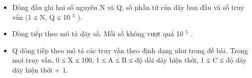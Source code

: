 \begin{itemize}
	\item     Dòng đầu ghi hai số nguyên N và Q, số phần tử của dãy ban đầu và số truy vấn (1 ≤ N, Q ≤ 10    $^     5    $    ).   
	\item     Dòng tiếp theo mô tả dãy số. Mỗi số không vượt quá 10    $^     5    $    .   
	\item     Q dòng tiếp theo mô tả các truy vấn theo định dạng như trong đề bài. Trong mọi truy vấn, 0 ≤ X ≤ 100, 1 ≤ A ≤ B ≤ độ dài dãy hiện thời, 1 ≤ C ≤ độ dãy dãy hiện thời + 1.   
\end{itemize}

\